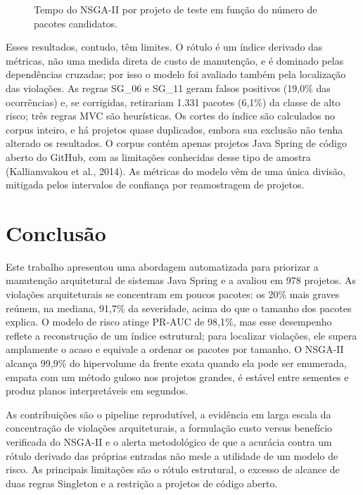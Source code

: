 \documentclass[
  a4paper,
]{article}
\begin{document}
\begin{figure}[htbp]
\centering

\caption{Tempo do NSGA-II por projeto de teste em função do número de pacotes candidatos.}
\label{fig:tempo}
\end{figure}

Esses resultados, contudo, têm limites. O rótulo é um índice derivado das métricas, não uma medida direta de custo de manutenção, e é dominado pelas dependências cruzadas; por isso o modelo foi avaliado também pela localização das violações. As regras SG\_06 e SG\_11 geram falsos positivos (19,0\% das ocorrências) e, se corrigidas, retirariam 1.331 pacotes (6,1\%) da classe de alto risco; três regras MVC são heurísticas. Os cortes do índice são calculados no corpus inteiro, e há projetos quase duplicados, embora sua exclusão não tenha alterado os resultados. O corpus contém apenas projetos Java Spring de código aberto do GitHub, com as limitações conhecidas desse tipo de amostra (Kalliamvakou et al., 2014). As métricas do modelo vêm de uma única divisão, mitigada pelos intervalos de confiança por reamostragem de projetos.

\hypertarget{conclusuxe3o}{%
\section{Conclusão}\label{conclusuxe3o}}

Este trabalho apresentou uma abordagem automatizada para priorizar a manutenção arquitetural de sistemas Java Spring e a avaliou em 978 projetos. As violações arquiteturais se concentram em poucos pacotes: os 20\% mais graves reúnem, na mediana, 91,7\% da severidade, acima do que o tamanho dos pacotes explica. O modelo de risco atinge PR-AUC de 98,1\%, mas esse desempenho reflete a reconstrução de um índice estrutural; para localizar violações, ele supera amplamente o acaso e equivale a ordenar os pacotes por tamanho. O NSGA-II alcança 99,9\% do hipervolume da frente exata quando ela pode ser enumerada, empata com um método guloso nos projetos grandes, é estável entre sementes e produz planos interpretáveis em segundos.

As contribuições são o pipeline reprodutível, a evidência em larga escala da concentração de violações arquiteturais, a formulação custo versus benefício verificada do NSGA-II e o alerta metodológico de que a acurácia contra um rótulo derivado das próprias entradas não mede a utilidade de um modelo de risco. As principais limitações são o rótulo estrutural, o excesso de alcance de duas regras Singleton e a restrição a projetos de código aberto.
\end{document}
